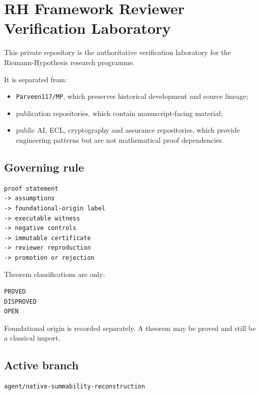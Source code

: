 \hypertarget{rh-framework-reviewer-verification-laboratory}{%
\chapter{RH Framework Reviewer Verification Laboratory}\label{rh-framework-reviewer-verification-laboratory}}

This private repository is the authoritative verification laboratory for the
Riemann-Hypothesis research programme.

It is separated from:

\begin{itemize}
\tightlist
\item
  \texttt{Parveen117/MP}, which preserves historical development and source lineage;
\item
  publication repositories, which contain manuscript-facing material;
\item
  public AI, ECL, cryptography and assurance repositories, which provide
  engineering patterns but are not mathematical proof dependencies.
\end{itemize}

\hypertarget{governing-rule}{%
\section{Governing rule}\label{governing-rule}}

\begin{verbatim}
proof statement
-> assumptions
-> foundational-origin label
-> executable witness
-> negative controls
-> immutable certificate
-> reviewer reproduction
-> promotion or rejection
\end{verbatim}

Theorem classifications are only:

\begin{verbatim}
PROVED
DISPROVED
OPEN
\end{verbatim}

Foundational origin is recorded separately. A theorem may be proved and still
be a classical import.

\hypertarget{active-branch}{%
\section{Active branch}\label{active-branch}}

\begin{verbatim}
agent/native-summability-reconstruction
\end{verbatim}


